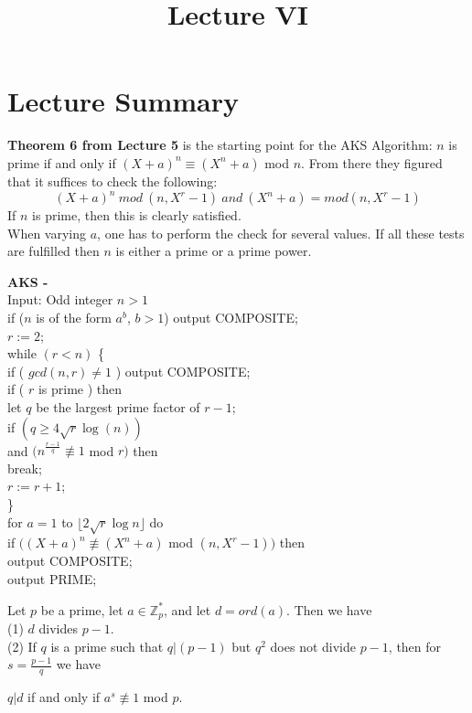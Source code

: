 \documentclass[a4paper]{article}
\title{\vspace{-2cm}Lecture VI\vspace{-2cm}}
\date{}
\begin{document}
\maketitle
\section{Lecture Summary}
\textbf{Theorem 6 from Lecture 5} is the starting point for the AKS Algorithm: $n$ is prime if and only if $(X + a)^{n} \equiv (X^{n} + a)$ mod $n$. From there they figured that it suffices to check the following: \\
$$(X + a)^{n}\ mod\ (n, X^{r} - 1)\ and\ (X^{n} + a)= mod (n, X^{r} - 1)$$
If $n$ is prime, then this is clearly satisfied. \\
When varying $a$, one has to perform the check for several values. If all these tests are fulfilled then $n$ is either a prime or a prime power.
\begin{algorithm}
\textbf{AKS -} \\
Input: Odd integer $n > 1$ \\
if ($n$ is of the form $a^{b}$, $b > 1$) output COMPOSITE; \\
$r := 2$; \\
while $( r < n )$ \{\\
\indent if ( $gcd(n,r) \neq 1$ ) output COMPOSITE; \\
\indent if ( $r$ is prime ) then \\
\indent \indent let $q$ be the largest prime factor of $r - 1$; \\
\indent \indent if $( q \geq 4 \sqrt{r} \log(n) )$ \\
\indent \indent and $( n^{\frac{r - 1}{q}} \not \equiv 1$ mod $r )$ then \\
\indent \indent \indent break; \\
$r := r + 1$; \\
\} \\
for $a = 1$ to $\lfloor 2 \sqrt{r} \log{n} \rfloor$ do \\
\indent if $( (X + a)^{n} \not \equiv (X^{n} + a)$ mod $(n, X^{r} - 1) )$ then\\
\indent output COMPOSITE; \\
output PRIME;
\end{algorithm}


\begin{lemma}
Let $p$ be a prime, let $a \in \mathbb{Z}_{p}^{*}$, and let $d = ord(a)$. Then we have\\
(1) $d$ divides $p - 1$. \\
(2) If $q$ is a prime such that $q|(p - 1)$ but $q^{2}$ does not divide $p - 1$, then for $s = \frac{p - 1}{q}$ we have
\begin{center}
$q|d$ if and only if $a^{s} \not \equiv 1$ mod $p$.
\end{center}
\end{lemma}
\end{document}
